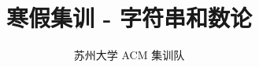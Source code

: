 \documentclass[lang=cn]{elegantpaper}
\title{寒假集训 - 字符串和数论}
\author{苏州大学 ACM 集训队}
\begin{document}
\isBeamerMode\relax
    \maketitle
    \tableofcontents
    \newpage
\fi

\isBeamerMode\relax
    \frame{\titlepage}
\fi



\def\TOCName{基础字符串读入} 
\def\TOCName{字典树} 
\def\TOCName{位运算} 
\def\TOCName{模运算} 
\def\TOCName{快速幂} 



\isBeamerMode\relax
\fi
\end{document}
